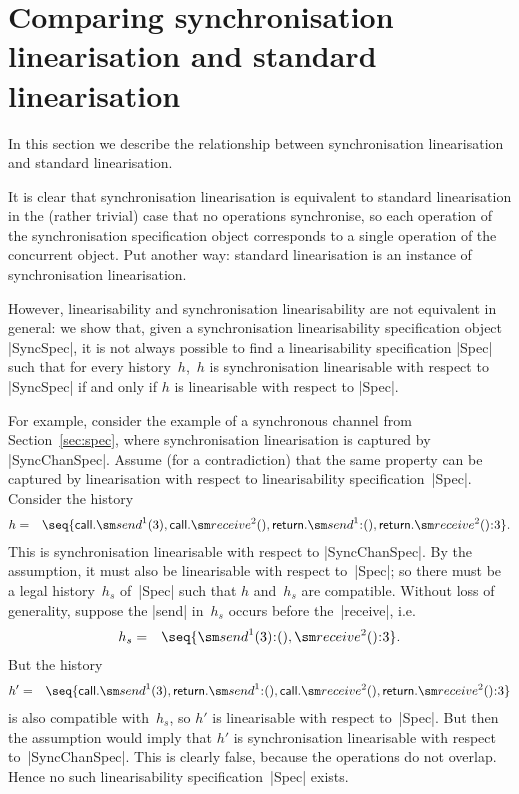 \section{Comparing synchronisation linearisation and standard linearisation}
\label{sec:relating}

In this section we describe the relationship between synchronisation
linearisation and standard linearisation.

It is clear that synchronisation linearisation is equivalent to standard
linearisation in the (rather trivial) case that no operations synchronise, so
each operation of the synchronisation specification object corresponds to a
single operation of the concurrent object.  Put another way: standard
linearisation is an instance of synchronisation linearisation. 


However, linearisability and synchronisation linearisability are not
equivalent in general: we show that, given a synchronisation linearisability
specification object |SyncSpec|, it is not always possible to find a
linearisability specification |Spec| such that for every history~$h$,\, $h$ is
synchronisation linearisable with respect to |SyncSpec| if and only if $h$ is
linearisable with respect to |Spec|.

For example, consider the example of a synchronous channel from
Section~\ref{sec:spec}, where synchronisation linearisation is captured by
|SyncChanSpec|.  Assume (for a contradiction) that the same property can be
captured by linearisation with respect to linearisability
specification~|Spec|.  Consider the history
\begin{eqnarray*}
h & = & \seq{ 
  \call.\send^1(3), \call.\receive^2(), 
  \return.\send^1\::(), \return.\receive^2()\::3 }.
\end{eqnarray*}
%
This is synchronisation linearisable with respect to |SyncChanSpec|.  By the
assumption, it must also be linearisable with respect to~|Spec|; so there must
be a legal history~$h_s$ of~|Spec| such that $h$ and~$h_s$ are compatible.
Without loss of generality, suppose the |send| in~$h_s$ occurs before
the~|receive|, i.e.
\begin{eqnarray*}
h_s & = & \seq{ \send^1(3)\::(), \receive^2()\::3 }.
\end{eqnarray*}
%
But the history
%
\begin{eqnarray*}
h' & = & \seq{ 
  \call.\send^1(3), \return.\send^1\::(), 
  \call.\receive^2(), \return.\receive^2()\::3 }
\end{eqnarray*}
%
is also compatible with~$h_s$, so $h'$ is linearisable with respect to~|Spec|.
But then the assumption would imply that $h'$ is synchronisation linearisable
with respect to~|SyncChanSpec|.  This is clearly false, because the operations
do not overlap.  Hence no such linearisability specification~|Spec| exists.


